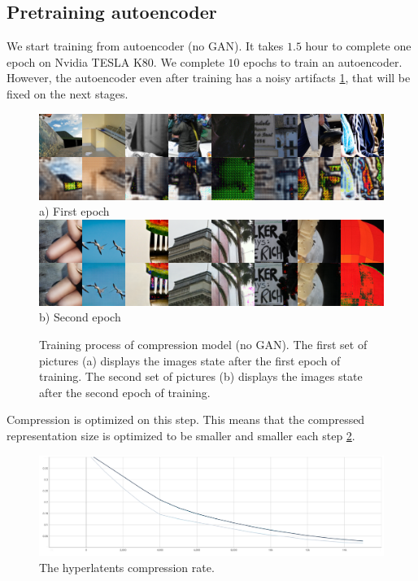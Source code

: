\subsection{Pretraining autoencoder}

We start training from autoencoder (no GAN). It takes $1.5$ hour to complete one epoch on Nvidia TESLA K80. We complete $10$ epochs to train an autoencoder. However, the autoencoder even after training has a noisy artifacts \ref{training-compression-examples}, that will be fixed on the next stages.

\begin{figure}[!ht]
    \centering
    \includegraphics[width=\textwidth]{figure/step_1000.png}
    a) First epoch
    \includegraphics[width=\textwidth]{figure/step_15000.png}
    b) Second epoch
    \caption{Training process of compression model (no GAN). The first set of pictures (a) displays the images state after the first epoch of training. The second set of pictures (b) displays the images state after the second epoch of training.}
    \label{training-compression-examples}
\end{figure}

Compression is optimized on this step. This means that the compressed representation size is optimized to be smaller and smaller each step \ref{training-compression-q-rate}.

\begin{figure}[!ht]
    \centering
    \includegraphics[width=\textwidth]{figure/compression-q-rate-hyperlatent.png}
    \caption{The hyperlatents compression rate.}
    \label{training-compression-q-rate}
\end{figure}

